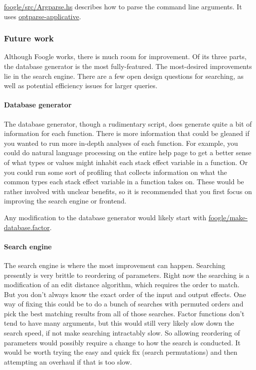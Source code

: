 \documentclass[
]{article}
\begin{document}
\href{https://github.com/factor-hmc/foogle/blob/master/src/Argparse.hs}{foogle/src/Argparse.hs}
describes how to parse the command line arguments. It uses
\href{https://hackage.haskell.org/package/optparse-applicative}{optparse-applicative}.

\hypertarget{future-work-1}{%
\subsubsection{Future work}\label{future-work-1}}

Although Foogle works, there is much room for improvement. Of its three
parts, the database generator is the most fully-featured. The
most-desired improvements lie in the search engine. There are a few open
design questions for searching, as well as potential efficiency issues
for larger queries.

\hypertarget{database-generator-1}{%
\paragraph{Database generator}\label{database-generator-1}}

The database generator, though a rudimentary script, does generate quite
a bit of information for each function. There is more information that
could be gleaned if you wanted to run more in-depth analyses of each
function. For example, you could do natural language processing on the
entire help page to get a better sense of what types or values might
inhabit each stack effect variable in a function. Or you could run some
sort of profiling that collects information on what the common types
each stack effect variable in a function takes on. These would be rather
involved with unclear benefits, so it is recommended that you first
focus on improving the search engine or frontend.

Any modification to the database generator would likely start with
\href{https://github.com/factor-hmc/foogle/blob/master/make-database.factor}{foogle/make-database.factor}.

\hypertarget{search-engine-1}{%
\paragraph{Search engine}\label{search-engine-1}}

The search engine is where the most improvement can happen. Searching
presently is very brittle to reordering of parameters. Right now the
searching is a modification of an edit distance algorithm, which
requires the order to match. But you don't always know the exact order
of the input and output effects. One way of fixing this could be to do a
bunch of searches with permuted orders and pick the best matching
results from all of those searches. Factor functions don't tend to have
many arguments, but this would still very likely slow down the search
speed, if not make searching intractably slow. So allowing reordering of
parameters would possibly require a change to how the search is
conducted. It would be worth trying the easy and quick fix (search
permutations) and then attempting an overhaul if that is too slow.
\end{document}
